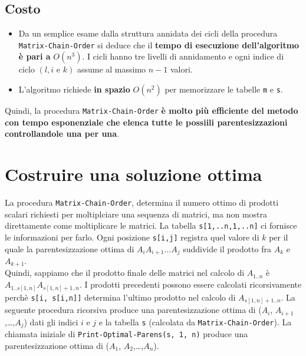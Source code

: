 \subsection{Costo}

\begin{itemize}
  \item
        Da un semplice esame dalla struttura annidata dei cicli della
        procedura \texttt{Matrix-Chain-Order} si deduce che il \textbf{tempo
          di esecuzione dell'algoritmo è pari a} $O(n^3)$. I cicli hanno tre
        livelli di annidamento e ogni indice di ciclo $(l,i \text{ e } k)$
        assume al massimo $n-1$ valori.
  \item
        L'algoritmo richiede \textbf{in spazio} $O(n^2)$ per memorizzare le
        tabelle \texttt{m} e \texttt{s}.
\end{itemize}

Quindi, la procedura \texttt{Matrix-Chain-Order} \textbf{è molto più
  efficiente del metodo con tempo esponenziale che elenca tutte le
  possiili parentesizzazioni controllandole una per una}.


\section{Costruire una soluzione ottima}

La procedura \texttt{Matrix-Chain-Order}, determina il numero ottimo di
prodotti scalari richiesti per moltiplciare una sequenza di matrici, ma
non mostra direttamente come moltiplicare le matrici. La tabella
\texttt{s{[}1,..n,1,..n{]}} ci fornisce le informazioni per farlo. Ogni
posizione \texttt{s{[}i,j{]}} registra quel valore di $k$ per il quale
la parentesizzazione ottima di $A_i A_{i+1}\ldots A_j$ suddivide il
prodotto fra $A_k$ e $A_{k+1}$.\\

Quindi, sappiamo che il prodotto finale delle matrici nel calcolo di
$A_{1..n}$ è $A_{1..s[1,n]} A_{s[1,n]+1..n}$. I prodotti precedenti
possono essere calcolati ricorsivamente perchè
\texttt{s{[}i,\ s{[}i,n{]}{]}} determina l'ultimo prodotto nel calcolo
di $A_{s[1,n]+1..n}$. La seguente procedura ricorsiva produce una
parentesizzazione ottima di ($A_i$, $A_{i+1}$,\ldots,$A_j$) dati
gli indici $i$ e $j$ e la tabella \texttt{s} (calcolata da
\texttt{Matrix-Chain-Order}). La chiamata iniziale di
\texttt{Print-Optimal-Parens(s,\ 1,\ n)} produce una parentesizzazione
ottima di ($A_1$, $A_2$,\ldots,$A_n$).\\


